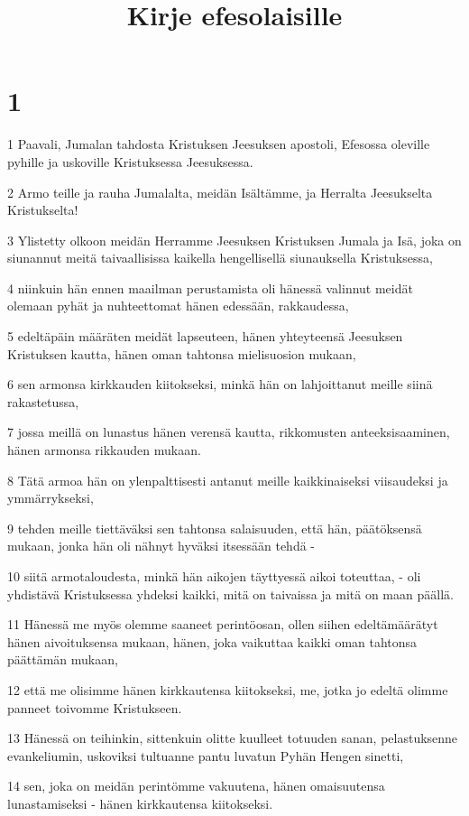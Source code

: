 

\title{Kirje efesolaisille}


\chapter{1}

\par 1 Paavali, Jumalan tahdosta Kristuksen Jeesuksen apostoli, Efesossa oleville pyhille ja uskoville Kristuksessa Jeesuksessa.
\par 2 Armo teille ja rauha Jumalalta, meidän Isältämme, ja Herralta Jeesukselta Kristukselta!
\par 3 Ylistetty olkoon meidän Herramme Jeesuksen Kristuksen Jumala ja Isä, joka on siunannut meitä taivaallisissa kaikella hengellisellä siunauksella Kristuksessa,
\par 4 niinkuin hän ennen maailman perustamista oli hänessä valinnut meidät olemaan pyhät ja nuhteettomat hänen edessään, rakkaudessa,
\par 5 edeltäpäin määräten meidät lapseuteen, hänen yhteyteensä Jeesuksen Kristuksen kautta, hänen oman tahtonsa mielisuosion mukaan,
\par 6 sen armonsa kirkkauden kiitokseksi, minkä hän on lahjoittanut meille siinä rakastetussa,
\par 7 jossa meillä on lunastus hänen verensä kautta, rikkomusten anteeksisaaminen, hänen armonsa rikkauden mukaan.
\par 8 Tätä armoa hän on ylenpalttisesti antanut meille kaikkinaiseksi viisaudeksi ja ymmärrykseksi,
\par 9 tehden meille tiettäväksi sen tahtonsa salaisuuden, että hän, päätöksensä mukaan, jonka hän oli nähnyt hyväksi itsessään tehdä -
\par 10 siitä armotaloudesta, minkä hän aikojen täyttyessä aikoi toteuttaa, - oli yhdistävä Kristuksessa yhdeksi kaikki, mitä on taivaissa ja mitä on maan päällä.
\par 11 Hänessä me myös olemme saaneet perintöosan, ollen siihen edeltämäärätyt hänen aivoituksensa mukaan, hänen, joka vaikuttaa kaikki oman tahtonsa päättämän mukaan,
\par 12 että me olisimme hänen kirkkautensa kiitokseksi, me, jotka jo edeltä olimme panneet toivomme Kristukseen.
\par 13 Hänessä on teihinkin, sittenkuin olitte kuulleet totuuden sanan, pelastuksenne evankeliumin, uskoviksi tultuanne pantu luvatun Pyhän Hengen sinetti,
\par 14 sen, joka on meidän perintömme vakuutena, hänen omaisuutensa lunastamiseksi - hänen kirkkautensa kiitokseksi.
